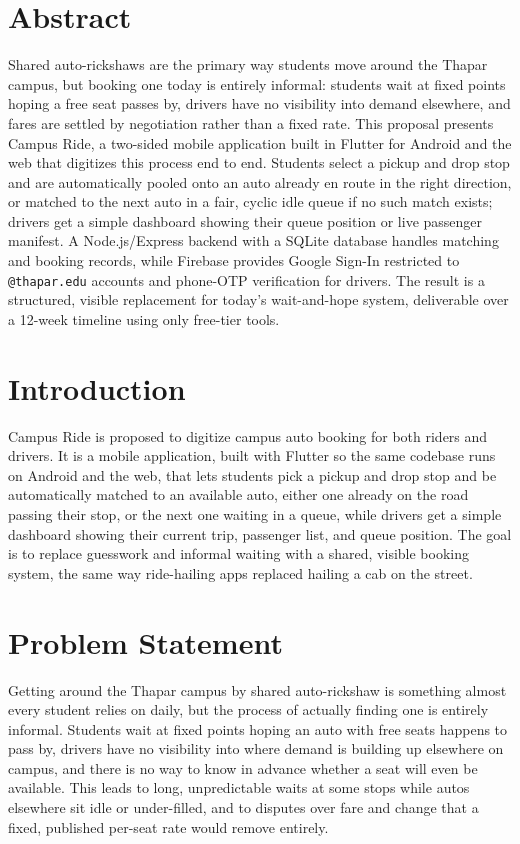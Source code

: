 \documentclass[11pt]{article}
\begin{document}
\section*{Abstract}
Shared auto-rickshaws are the primary way students move around the Thapar campus, but booking one today is entirely informal: students wait at fixed points hoping a free seat passes by, drivers have no visibility into demand elsewhere, and fares are settled by negotiation rather than a fixed rate. This proposal presents Campus Ride, a two-sided mobile application built in Flutter for Android and the web that digitizes this process end to end. Students select a pickup and drop stop and are automatically pooled onto an auto already en route in the right direction, or matched to the next auto in a fair, cyclic idle queue if no such match exists; drivers get a simple dashboard showing their queue position or live passenger manifest. A Node.js/Express backend with a SQLite database handles matching and booking records, while Firebase provides Google Sign-In restricted to \texttt{@thapar.edu} accounts and phone-OTP verification for drivers. The result is a structured, visible replacement for today's wait-and-hope system, deliverable over a 12-week timeline using only free-tier tools.

\section{Introduction}
Campus Ride is proposed to digitize campus auto booking for both riders and drivers. It is a mobile application, built with Flutter so the same codebase runs on Android and the web, that lets students pick a pickup and drop stop and be automatically matched to an available auto, either one already on the road passing their stop, or the next one waiting in a queue, while drivers get a simple dashboard showing their current trip, passenger list, and queue position. The goal is to replace guesswork and informal waiting with a shared, visible booking system, the same way ride-hailing apps replaced hailing a cab on the street.

\section{Problem Statement}
Getting around the Thapar campus by shared auto-rickshaw is something almost every student relies on daily, but the process of actually finding one is entirely informal. Students wait at fixed points hoping an auto with free seats happens to pass by, drivers have no visibility into where demand is building up elsewhere on campus, and there is no way to know in advance whether a seat will even be available. This leads to long, unpredictable waits at some stops while autos elsewhere sit idle or under-filled, and to disputes over fare and change that a fixed, published per-seat rate would remove entirely.
\end{document}
